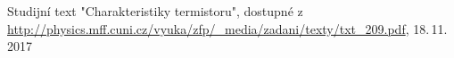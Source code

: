 \documentclass[0-protokol.tex]{subfiles}
\begin{document}
\begin{thebibliography}{}

Studijní text "Charakteristiky termistoru", dostupné z\\ \url{http://physics.mff.cuni.cz/vyuka/zfp/_media/zadani/texty/txt_209.pdf}, 18.\,11.\,2017

\end{thebibliography}
\end{document}
